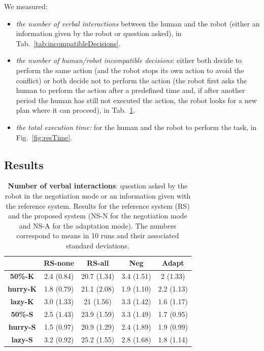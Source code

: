 \documentclass[english,a4paper,11pt,twoside]{StyleThese}
\begin{document}
\bigskip
We measured:
\begin{itemize}
\item \textit{the number of verbal interactions} between the human and the robot (either an information given by the robot or question asked), in Tab.~\ref{tab:incompatibleDecisions}.
\item \textit{the number of human/robot incompatible decisions}: either both decide to perform the same action (and the robot stops its own action to avoid the conflict) or both decide not to perform the action (the robot first asks the human to perform the action after a predefined time and, if after another period the human has still not executed the action, the robot looks for a new plan where it can proceed), in Tab.~\ref{tab:verbalInteraction}.
\item \textit{the total execution time:} for the human and the robot to perform the task, in Fig.~\ref{fig:resTime}.
\end{itemize}

\subsection{Results}

\begin{table}[!h]
\centering
  \begin{tabular}{|c||c|c|c|c|}
  \hline
     & \textbf{RS-none} & \textbf{RS-all} & \textbf{Neg} & \textbf{Adapt} \\
  \hline
  \hline
     \textbf{50\%-K} & 2.4 (0.84) & 20.7 (1.34) & 3.4 (1.51) & 2 (1.33) \\
  \hline
     \textbf{hurry-K} & 1.8 (0.79) & 21.1 (2.08) & 1.9 (1.10) & 2.2 (1.13) \\
  \hline
     \textbf{lazy-K} & 3.0 (1.33) & 21 (1.56) & 3.3 (1.42) & 1.6 (1.17) \\
  \hline
     \textbf{50\%-S} & 2.5 (1.43) & 23.9 (1.59) & 3.3 (1.49) & 1.7 (0.95)\\
  \hline
     \textbf{hurry-S} & 1.5 (0.97) & 20.9 (1.29) & 2.4 (1.89) & 1.9 (0.99)\\
  \hline
     \textbf{lazy-S} & 3.2 (0.92) & 25.2 (1.55) & 2.8 (1.68) & 1.8 (1.14)\\
  \hline
  \end{tabular}
   \caption{\textbf{Number of verbal interactions}: question asked by the robot in the negotiation mode or an information given with the reference system. Results for the reference system (RS) and the proposed system (NS-N for the negotiation mode and NS-A for the adaptation mode). The numbers correspond to means in 10 runs and their associated standard deviations.}
   \label{tab:verbalInteraction}
\end{table}
\end{document}
